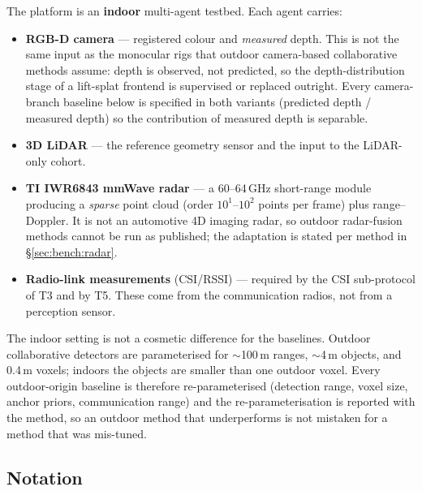 The platform is an \textbf{indoor} multi-agent testbed. Each agent carries:

\begin{itemize}
  \item \textbf{RGB-D camera} --- registered colour and \emph{measured} depth.
        This is not the same input as the monocular rigs that outdoor
        camera-based collaborative methods assume: depth is observed, not
        predicted, so the depth-distribution stage of a lift-splat frontend is
        supervised or replaced outright. Every camera-branch baseline below is
        specified in both variants (predicted depth / measured depth) so the
        contribution of measured depth is separable.
  \item \textbf{3D LiDAR} --- the reference geometry sensor and the input to
        the LiDAR-only cohort.
  \item \textbf{TI IWR6843 mmWave radar} --- a 60--64\,GHz short-range module
        producing a \emph{sparse} point cloud (order $10^1$--$10^2$ points per
        frame) plus range--Doppler. It is not an automotive 4D imaging radar,
        so outdoor radar-fusion methods cannot be run as published; the
        adaptation is stated per method in \S\ref{sec:bench:radar}.
  \item \textbf{Radio-link measurements} (CSI/RSSI) --- required by the CSI
        sub-protocol of T3 and by T5. These come from the communication radios,
        not from a perception sensor.
\end{itemize}

The indoor setting is not a cosmetic difference for the baselines. Outdoor
collaborative detectors are parameterised for $\sim$100\,m ranges, $\sim$4\,m
objects, and 0.4\,m voxels; indoors the objects are smaller than one outdoor
voxel. Every outdoor-origin baseline is therefore re-parameterised (detection
range, voxel size, anchor priors, communication range) and the re-parameterisation
is reported with the method, so an outdoor method that underperforms is not
mistaken for a method that was mis-tuned.

\subsection{Notation}
\label{sec:bench:notation}

